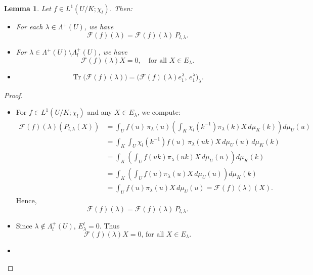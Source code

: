 \documentclass[11pt,a4paper]{amsart}
\DeclareMathOperator{\Tr}{Tr}
\newtheorem{lemma}[theorem]{Lemma}
\theoremstyle{definition}
\numberwithin{equation}{section}
\begin{document}
 



{  


\begin{lemma} \label{orthogonal projection 1}
Let $f \in L^1(U/K; \chi_l)$. Then:

\begin{itemize}
  \item[(i)] For each $\lambda \in \Lambda^+(U)$, we have
  \[
    \mathcal{F}(f)(\lambda) = \mathcal{F}(f)(\lambda) \, P_{l,\lambda}.
  \]

  \item[(ii)] For $\lambda \in \Lambda^+(U) \setminus \Lambda^+_l(U)$, we have
  \[
    \mathcal{F}(f)(\lambda) X = 0, \quad \text{for all } X \in E_\lambda.
  \]

  \item[(iii)] 
  \[
    \Tr\bigl(\mathcal{F}(f)(\lambda)\bigr) = \bigl( \mathcal{F}(f)(\lambda)e_1^\lambda,\, e_1^\lambda \bigr)_\lambda.
  \]
\end{itemize}
\end{lemma}

\begin{proof}
\begin{itemize}
  \item[(i)] 
  For $f \in L^1(U/K; \chi_l)$ and any $X \in E_\lambda$, we compute:
  \begin{align*}
    \mathcal{F}(f)(\lambda)\left(P_{l,\lambda}(X)\right)
    &= \int_U f(u) \, \pi_\lambda(u) \left( \int_K \chi_l(k^{-1}) \pi_\lambda(k) X \, d\mu_K(k) \right) d\mu_U(u) \\
    &= \int_K \int_U \chi_l(k^{-1}) f(u) \, \pi_\lambda(uk) X \, d\mu_U(u) \, d\mu_K(k) \\
    &= \int_K \left( \int_U f(uk) \pi_\lambda(uk) X \, d\mu_U(u) \right) d\mu_K(k) \\
    &= \int_K \left( \int_U f(u) \pi_\lambda(u) X \, d\mu_U(u) \right) d\mu_K(k) \\
    &= \int_U f(u) \pi_\lambda(u) X \, d\mu_U(u) = \mathcal{F}(f)(\lambda)(X).
  \end{align*}
  Hence,
  \[
    \mathcal{F}(f)(\lambda) = \mathcal{F}(f)(\lambda) \, P_{l,\lambda}.
  \]

  \item[(ii)] 
 Since $\lambda \not \in   \Lambda^+_l(U)$,  $E_\lambda^l =0 $.  Thus $$    \mathcal{F}(f)(\lambda) X = 0 \text{,  for all  } X \in E_\lambda.$$ 
 

  \item[(iii)] 


\end{itemize}
\end{proof}}
\end{document}
